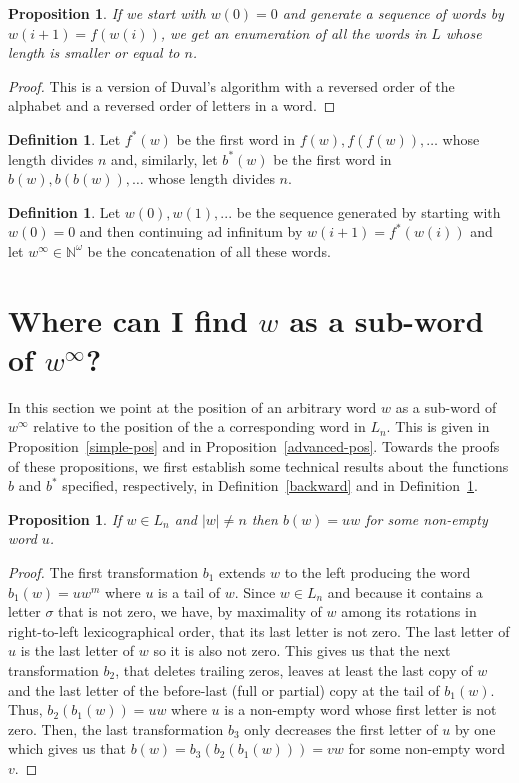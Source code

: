 \documentclass{article}
\newtheorem{proposition}[theorem]{Proposition}
\theoremstyle{definition}
\newtheorem{definition}[theorem]{Definition}
\newcommand{\N}{{\mathbb{N}}}
\begin{document}
\begin{proposition}
	If we start with $w(0)=0$ and generate a sequence of words by $w({i+1})=f(w(i))$, we get an enumeration of all the words in $L$ whose length is smaller or equal to $n$.
\end{proposition}
\begin{proof}
	This is a version of Duval's algorithm with a reversed order of the alphabet and a reversed order of letters in a word. 
\end{proof}

\begin{definition} \label{star-functions}
	Let $f^*(w)$ be the first word in ${f(w),f(f(w)),\dots}$ whose length divides $n$ and, similarly, let $b^*(w)$ be the first word in ${b(w),b(b(w)),\dots}$ whose length divides $n$. 
\end{definition}


\begin{definition}
	Let $w(0),w(1),...$ be the sequence generated by starting with $w(0)=0$ and then continuing ad infinitum by $w{(i+1)}=f^*(w(i))$ and let $w^\infty\in \N^\omega$ be the concatenation of all these words.
\end{definition}



\section{Where can I find $w$ as a sub-word of $w^\infty$?}

In this section we point at the position of an arbitrary word $w$ as a sub-word of  $w^\infty$ relative to the position of the a corresponding word in $L_n$. This is given in Proposition~\ref{simple-pos} and in Proposition~\ref{advanced-pos}. Towards the proofs of these propositions, we first establish some technical results about the functions $b$ and $b^*$ specified, respectively, in Definition~\ref{backward} and in Definition~\ref{star-functions}.


\begin{proposition}
	\label{w-at-the-tail}
	If $w \in L_n$ and $|w| \neq n$ then  $b(w)=uw$ for some non-empty word $u$. 
\end{proposition}
\begin{proof}
	The first transformation $b_1$ extends $w$ to the left producing the word $b_1(w)=uw^m$ where $u$ is a tail of $w$. Since $w \in L_n$ and because it contains a letter $\sigma$ that is not zero, we have, by maximality of $w$ among its rotations in right-to-left lexicographical order,  that its last letter is not zero. The last letter of $u$ is the last letter of $w$ so it is also not zero. This gives us that the next transformation $b_2$, that deletes trailing zeros, leaves at least the last copy of $w$ and the last letter of the before-last (full or partial) copy at the tail of $b_1(w)$. Thus, $b_2(b_1(w))=uw$ where $u$ is a non-empty word whose first letter is not zero. Then, the last transformation $b_3$ only decreases the first letter of $u$ by  one which gives us that $b(w)=b_3(b_2(b_1(w)))=vw$ for some non-empty word $v$.	
\end{proof}
	
\end{document}
